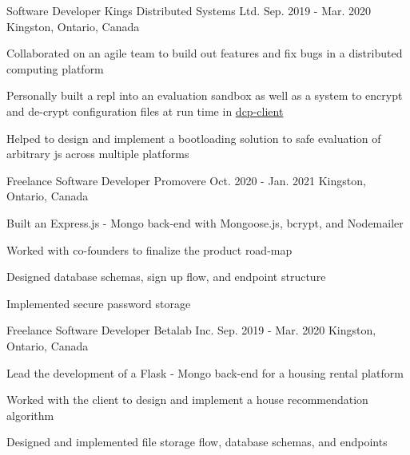 

\begin{cventries}

  \cventry
    {Software Developer} %
    {Kings Distributed Systems Ltd.} %
    {Sep. 2019 - Mar. 2020} %
    {Kingston, Ontario, Canada} %
    {
      \begin{cvitems} %
        \item{Collaborated on an agile team to build out features and fix bugs in a distributed computing platform}
        \item{Personally built a repl into an evaluation sandbox as well as a system to encrypt and de-crypt configuration files at run time in \href{https://www.npmjs.com/package/dcp-client}{dcp-client}}
        \item{Helped to design and implement a bootloading solution to safe evaluation of arbitrary js across multiple platforms}
      \end{cvitems}
    }

  \cventry
    {Freelance Software Developer} %
    {Promovere} %
    {Oct. 2020 - Jan. 2021} %
    {Kingston, Ontario, Canada} %
    {
      \begin{cvitems} %
        \item {Built an Express.js - Mongo back-end with Mongoose.js, bcrypt, and Nodemailer}
        \item{Worked with co-founders to finalize the product road-map}
        \item{Designed database schemas, sign up flow, and endpoint structure}
        \item{Implemented secure password storage}
      \end{cvitems}
    }

  \cventry
    {Freelance Software Developer} %
    {Betalab Inc.} %
    {Sep. 2019 - Mar. 2020} %
    {Kingston, Ontario, Canada} %
    {
      \begin{cvitems} %
        \item {Lead the development of a Flask - Mongo back-end for a housing rental platform} %
        \item{Worked with the client to design and implement a house recommendation algorithm}
        \item{Designed and implemented file storage flow, database schemas, and endpoints}
      \end{cvitems}
    }


\end{cventries}
